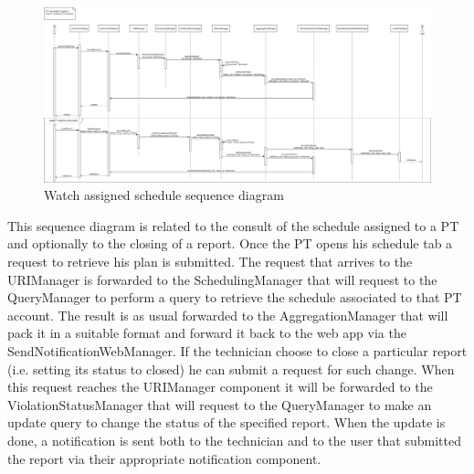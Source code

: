 \begin{figure}[H]
  \centering
  \includegraphics[width=1\textwidth]{Images/UML_diagrams/Sequence_Diagrams/Watch_schedule_sd.png}
  \caption{Watch assigned schedule sequence diagram}
  \label{fig:watch_schedule_sd}
\end{figure}This sequence diagram is related to the consult of the schedule assigned to a PT and optionally to the closing of a report. Once the PT opens his schedule tab a request to retrieve his plan is submitted. The request that arrives to the URIManager is forwarded to the SchedulingManager that will request to the QueryManager to perform a query to retrieve the schedule associated to that PT account. The result is as usual forwarded to the AggregationManager that will pack it in a suitable format and forward it back to the web app via the SendNotificationWebManager. If the technician choose to close a particular report (i.e. setting its status to closed) he can submit a request for such change. When this request reaches the URIManager component it will be forwarded to the ViolationStatusManager that will request to the QueryManager to make an update query to change the status of the specified report. When the update is done, a notification is sent both to the technician and to the user that submitted the report via their appropriate notification component. 

